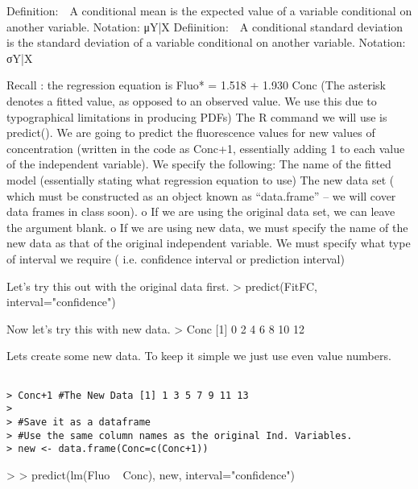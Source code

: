 Definition:  A conditional mean is the expected value of a variable conditional on another
variable.
Notation: μY|X
Defiinition:  A conditional standard deviation is the standard deviation of a variable
conditional on another variable.
Notation: σY|X




Recall : the regression equation is
Fluo* = 1.518 + 1.930 Conc
(The asterisk denotes a fitted value, as opposed to an observed value. We use this due to typographical limitations in producing PDFs)
The R command we will use is predict(). We are going to predict the fluorescence values for new values of concentration (written in the code as Conc+1, essentially adding 1 to each value of the independent variable). We specify the following: The name of the fitted model (essentially stating what regression equation to use) The new data set ( which must be constructed as an object known as “data.frame” – we will cover data frames in class soon).
o If we are using the original data set, we can leave the argument blank.
o If we are using new data, we must specify the name of the new data as that of the original independent variable. We must specify what type of interval we require (
i.e. confidence interval or prediction interval)

Let’s try this out with the original data first. 
> predict(FitFC, interval="confidence") 

Now let’s try this with new data. 
> Conc [1] 0 2 4 6 8 10 12 


Lets create some new data. To keep it simple we just use even value numbers.
\begin{framed}
\begin{verbatim}

> Conc+1 #The New Data [1] 1 3 5 7 9 11 13 
> 
> #Save it as a dataframe 
> #Use the same column names as the original Ind. Variables. 
> new <- data.frame(Conc=c(Conc+1)) 
\end{verbatim}
\end{framed}


> 
> predict(lm(Fluo ~ Conc), new, interval="confidence") 